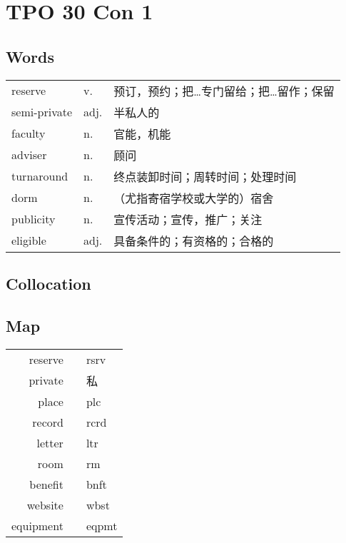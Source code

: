\section{TPO 30 Con 1}

\subsection{Words}

\begin{tabular}{lll}
    reserve      & v.   & 预订，预约；把…专门留给；把…留作；保留 \\
    semi-private & adj. & 半私人的                 \\
    faculty      & n.   & 官能，机能                \\
    adviser      & n.   & 顾问                   \\
    turnaround   & n.   & 终点装卸时间；周转时间；处理时间     \\
    dorm         & n.   & （尤指寄宿学校或大学的）宿舍       \\
    publicity    & n.   & 宣传活动；宣传，推广；关注        \\
    eligible     & adj. & 具备条件的；有资格的；合格的       \\
\end{tabular}

\subsection{Collocation}

\subsection{Map}

\begin{tabular}{rc@{\quad$\to$\quad}l}
    reserve   &  & rsrv  \\
    private   &  & 私     \\
    place     &  & plc   \\
    record    &  & rcrd  \\
    letter    &  & ltr   \\
    room      &  & rm    \\
    benefit   &  & bnft  \\
    website   &  & wbst  \\
    equipment &  & eqpmt \\
\end{tabular}
